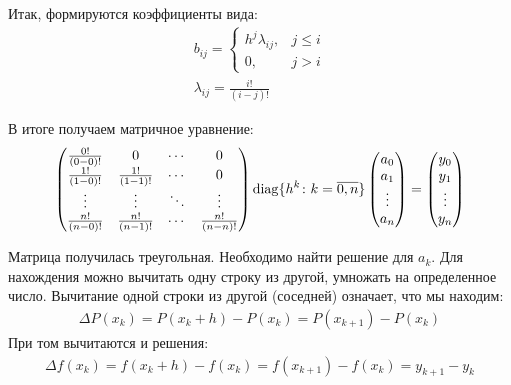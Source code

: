 Итак, формируются коэффициенты вида:
\begin{align}
	b_{ij} = \begin{cases}
		         h^j \lambda_{ij}, & j \leq i \\
		         0,                & j > i
	         \end{cases} \\
	\lambda_{ij} = \frac{i!}{(i-j)!} \label{eq:lambda_def}
\end{align}

В итоге получаем матричное уравнение:
\begin{align}
	\begin{pmatrix}
		\frac{0!}{(0-0)!} & 0                 & \cdots & 0                 \\
		\frac{1!}{(1-0)!} & \frac{1!}{(1-1)!} & \cdots & 0                 \\
		\vdots            & \vdots            & \ddots & \vdots            \\
		\frac{n!}{(n-0)!} & \frac{n!}{(n-1)!} & \cdots & \frac{n!}{(n-n)!} \\
	\end{pmatrix}
	\operatorname{diag}\{ h^k \colon k = \overline{0, n}\}
	\begin{pmatrix}
		a_0    \\
		a_1    \\
		\vdots \\
		a_n    \\
	\end{pmatrix} =
	\begin{pmatrix}
		y_0    \\
		y_1    \\
		\vdots \\
		y_n    \\
	\end{pmatrix}
\end{align}

Матрица получилась треугольная. Необходимо найти решение для \(a_k\). Для нахождения можно вычитать одну строку из другой, умножать на определенное число. Вычитание одной строки из другой (соседней) означает, что мы находим:
\begin{align}
	\Delta P(x_k) = P(x_k + h) - P(x_k) = P(x_{k + 1}) - P(x_k)
\end{align}
При том вычитаются и решения:
\begin{align}
	\Delta f(x_k) = f(x_k + h) - f(x_k) = f(x_{k + 1}) - f(x_k) = y_{k + 1} - y_{k}
\end{align}

